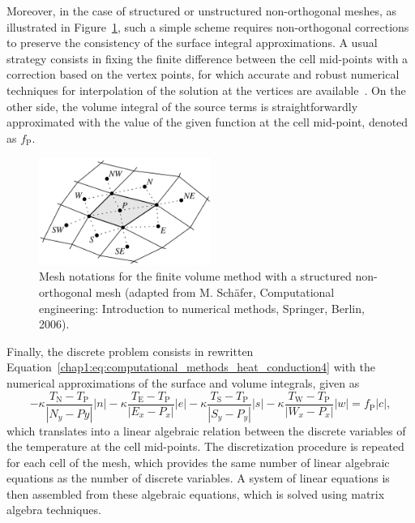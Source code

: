Moreover, in the case of structured or unstructured non-orthogonal meshes, as illustrated in Figure~\ref{chap1:fig:computational_methods_finite_volume_method_nonorthogonal}, such a simple scheme requires non-orthogonal corrections to preserve the consistency of the surface integral approximations.
A usual strategy consists in fixing the finite difference between the cell mid-points with a correction based on the vertex points, for which accurate and robust numerical techniques for interpolation of the solution at the vertices are available~\cite{chap1:2014costa}.
On the other side, the volume integral of the source terms is straightforwardly approximated with the value of the given function at the cell mid-point, denoted as $f_{\textrm{P}}$.

\begin{figure}[!htp]
\centering
\includegraphics[width=0.5\textwidth]{chap1/include/figures/finite_volume_method_nonorthogonal.png}
\caption[Mesh notations for the finite volume method with a non-orthogonal mesh.]{Mesh notations for the finite volume method with a structured non-orthogonal mesh (adapted from M. Sch\"afer, Computational engineering: Introduction to numerical methods, Springer, Berlin, 2006).}
\label{chap1:fig:computational_methods_finite_volume_method_nonorthogonal}
\end{figure}

Finally, the discrete problem consists in rewritten Equation~\cref{chap1:eq:computational_methods_heat_conduction4} with the numerical approximations of the surface and volume integrals, given as
\begin{equation}
-\kappa\frac{T_{\textrm{N}}-T_{\textrm{P}}}{\left\vert N_{y}-P{y}\right\vert}\left\vert n\right\vert-\kappa\frac{T_{\textrm{E}}-T_{\textrm{P}}}{\left\vert E_{x}-P_{x}\right\vert}\left\vert e\right\vert-\kappa\frac{T_{\textrm{S}}-T_{\textrm{P}}}{\left\vert S_{y}-P_{y}\right\vert}\left\vert s\right\vert-\kappa\frac{T_{\textrm{W}}-T_{\textrm{P}}}{\left\vert W_{x}-P_{x}\right\vert}\left\vert w\right\vert=f_{\textrm{P}}\left\vert c\right\vert,
\label{chap1:eq:computational_methods_heat_conduction5}
\end{equation}
which translates into a linear algebraic relation between the discrete variables of the temperature at the cell mid-points.
The discretization procedure is repeated for each cell of the mesh, which provides the same number of linear algebraic equations as the number of discrete variables.
A system of linear equations is then assembled from these algebraic equations, which is solved using matrix algebra techniques.


